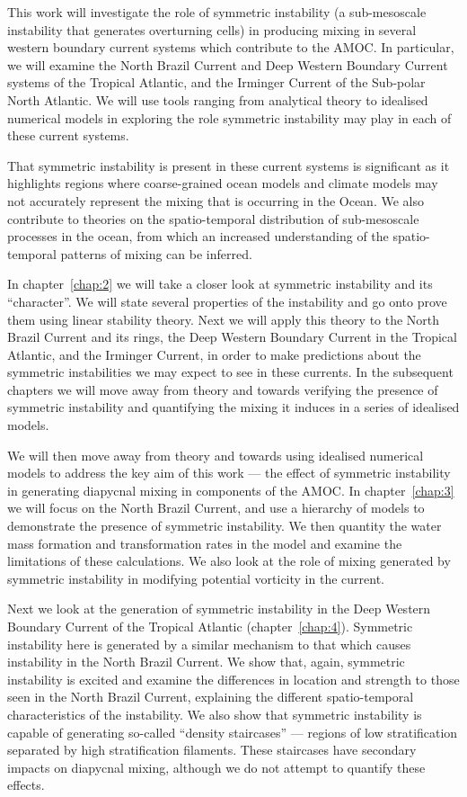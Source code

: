 This work will investigate the role of symmetric instability (a sub-mesoscale instability that generates overturning cells) in producing mixing in several western boundary current systems which contribute to the AMOC. In particular, we will examine the North Brazil Current and Deep Western Boundary Current systems of the Tropical Atlantic, and the Irminger Current of the Sub-polar North Atlantic. We will use tools ranging from analytical theory to idealised numerical models in exploring the role symmetric instability may play in each of these current systems.

That symmetric instability is present in these current systems is significant as it highlights regions where coarse-grained ocean models and climate models may not accurately represent the mixing that is occurring in the Ocean. We also contribute to theories on the spatio-temporal distribution of sub-mesoscale processes in the ocean, from which an increased understanding of the spatio-temporal patterns of mixing can be inferred.

In chapter~\ref{chap:2} we will take a closer look at symmetric instability and its ``character''. We will state several properties of the instability and go onto prove them using linear stability theory. Next we will apply this theory to the North Brazil Current and its rings, the Deep Western Boundary Current in the Tropical Atlantic, and the Irminger Current, in order to make predictions about the symmetric instabilities we may expect to see in these currents. In the subsequent chapters we will move away from theory and towards verifying the presence of symmetric instability and quantifying the mixing it induces in a series of idealised models.

We will then move away from theory and towards using idealised numerical models to address the key aim of this work --- the effect of symmetric instability in generating diapycnal mixing in components of the AMOC. In chapter~\ref{chap:3} we will focus on the North Brazil Current, and use a hierarchy of models to demonstrate the presence of symmetric instability. We then quantity the water mass formation and transformation rates in the model and examine the limitations of these calculations. We also look at the role of mixing generated by symmetric instability in modifying potential vorticity in the current.

Next we look at the generation of symmetric instability in the Deep Western Boundary Current of the Tropical Atlantic (chapter~\ref{chap:4}). Symmetric instability here is generated by a similar mechanism to that which causes instability in the North Brazil Current. We show that, again, symmetric instability is excited and examine the differences in location and strength to those seen in the North Brazil Current, explaining the different spatio-temporal characteristics of the instability. We also show that symmetric instability is capable of generating so-called ``density staircases'' --- regions of low stratification separated by high stratification filaments. These staircases have secondary impacts on diapycnal mixing, although we do not attempt to quantify these effects.

